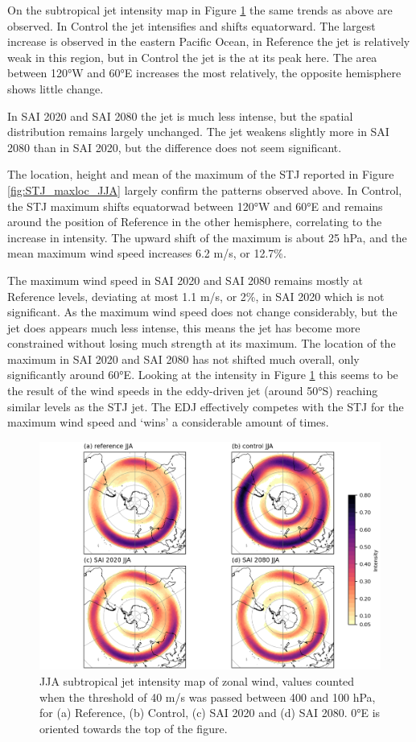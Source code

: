 On the subtropical jet intensity map in Figure \ref{fig:STJ_map_JJA} the same trends as above are observed. In Control the jet intensifies and shifts equatorward. The largest increase is observed in the eastern Pacific Ocean, in Reference the jet is relatively weak in this region, but in Control the jet is the at its peak here. The area between 120°W and 60°E increases the most relatively, the opposite hemisphere shows little change.

In SAI 2020 and SAI 2080 the jet is much less intense, but the spatial distribution remains largely unchanged. The jet weakens slightly more in SAI 2080 than in SAI 2020, but the difference does not seem significant. 

The location, height and mean of the maximum of the STJ reported in Figure \ref{fig:STJ_maxloc_JJA} largely confirm the patterns observed above. In Control, the STJ maximum shifts equatorwad between 120°W and 60°E and remains around the position of Reference in the other hemisphere, correlating to the increase in intensity. The upward shift of the maximum is about 25 hPa, and the mean maximum wind speed increases 6.2 m/s, or 12.7\%. 

The maximum wind speed in SAI 2020 and SAI 2080 remains mostly at Reference levels, deviating at most 1.1 m/s, or 2\%, in SAI 2020 which is not significant. As the maximum wind speed does not change considerably, but the jet does appears much less intense, this means the jet has become more constrained without losing much strength at its maximum. The location of the maximum in SAI 2020 and SAI 2080 has not shifted much overall, only significantly around 60°E. Looking at the intensity in Figure \ref{fig:STJ_map_JJA} this seems to be the result of the wind speeds in the eddy-driven jet (around 50°S) reaching similar levels as the STJ jet. The EDJ effectively competes with the STJ for the maximum wind speed and `wins' a considerable amount of times.


\begin{figure}[H]
	\centering
	\includegraphics[width=0.95\linewidth]{images/STJ_map_JJA.png}
	\caption{JJA subtropical jet intensity map of zonal wind, values counted when the threshold of 40 m/s was passed between 400 and 100 hPa, for (a) Reference, (b) Control, (c) SAI 2020 and (d) SAI 2080. 0°E is oriented towards the top of the figure.}
	\label{fig:STJ_map_JJA}
\end{figure}

